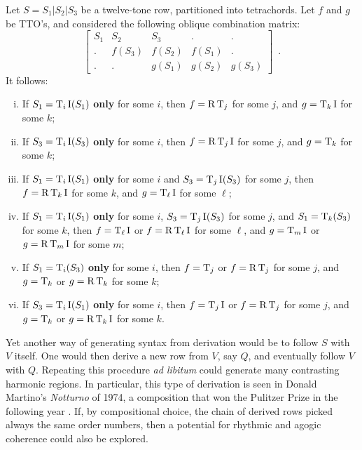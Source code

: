\begin{example}
	\cite[241]{Martino1961}
	\label{ex:oblique}
	Let $S = S_1 | S_2 | S_3$ be a twelve-tone row, partitioned into tetrachords. Let $f$ and $g$ be TTO's, and considered the following oblique combination matrix:
	\begin{equation}
    	\left[
    	\begin{array}{c|c|c|c|c}
        	S_1 & S_2 & S_3 & . & . \\
        	. & f(S_3) & f(S_2) & f(S_1) & . \\
        	. & . & g(S_1) & g(S_2) & g(S_3)
    	\end{array}
    	\right] \enspace.
	\end{equation}
	It follows:
	\begin{enumerate}[i.]
		\item If $S_1 = \operatorname{T}_i\operatorname{I}(S_1)$ \textbf{only} for some $i$, then $f = \operatorname{R}\operatorname{T}_j$ for some $j$, and $g = \operatorname{T}_k\operatorname{I}$ for some $k$;
		\item If $S_3 = \operatorname{T}_i\operatorname{I}(S_3)$ \textbf{only} for some $i$, then $f = \operatorname{R}\operatorname{T}_j\operatorname{I}$ for some $j$, and $g = \operatorname{T}_k$ for some $k$;
		\item If $S_1 = \operatorname{T}_i\operatorname{I}(S_1)$ \textbf{only} for some $i$ and $S_3 = \operatorname{T}_j\operatorname{I}(S_3)$ for some $j$, then $f = \operatorname{R}\operatorname{T}_k\operatorname{I}$ for some $k$, and $g = \operatorname{T}_\ell\operatorname{I}$ for some $\ell$;
		\item If $S_1 = \operatorname{T}_i\operatorname{I}(S_1)$ \textbf{only} for some $i$, $S_3 = \operatorname{T}_j\operatorname{I}(S_3)$ for some $j$, and $S_1 = \operatorname{T}_k(S_3)$ for some $k$, then $f = \operatorname{T}_\ell\operatorname{I}$ or $f = \operatorname{R}\operatorname{T}_\ell\operatorname{I}$ for some $\ell$, and $g = \operatorname{T}_m\operatorname{I}$ or $g = \operatorname{R}\operatorname{T}_m\operatorname{I}$ for some $m$;
		\item If $S_1 = \operatorname{T}_i(S_3)$ \textbf{only} for some $i$, then $f = \operatorname{T}_j$ or $f = \operatorname{R}\operatorname{T}_j$ for some $j$, and $g = \operatorname{T}_k$ or $g = \operatorname{R}\operatorname{T}_k$ for some $k$;
		\item If $S_3 = \operatorname{T}_i\operatorname{I}(S_1)$ \textbf{only} for some $i$, then $f = \operatorname{T}_j\operatorname{I}$ or $f = \operatorname{R}\operatorname{T}_j$ for some $j$, and $g = \operatorname{T}_k$ or $g = \operatorname{R}\operatorname{T}_k\operatorname{I}$ for some $k$.
	\end{enumerate}
\end{example}

Yet another way of generating syntax from derivation would be to follow $S$ with $V$ itself. One would then derive a new row from $V$, say $Q$, and eventually follow $V$ with $Q$. Repeating this procedure \emph{ad libitum} could generate many contrasting harmonic regions. In particular, this type of derivation is seen in Donald Martino's \emph{Notturno} of 1974, a composition that won the Pulitzer Prize in the following year \cite[181]{Starr1984}. If, by compositional choice, the chain of derived rows picked always the same order numbers, then a potential for rhythmic and agogic coherence could also be explored.

